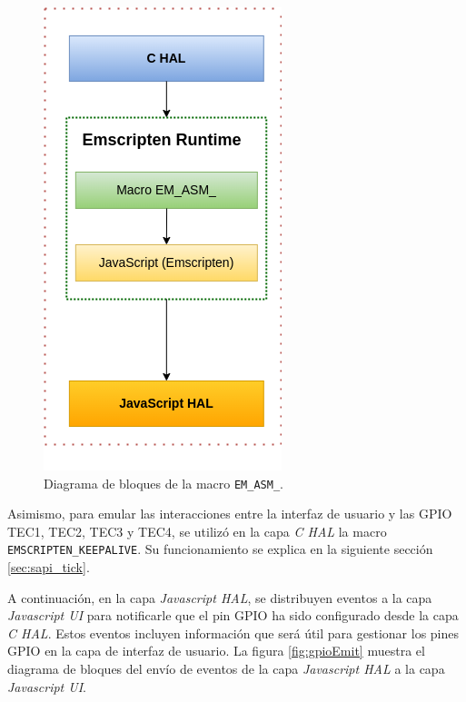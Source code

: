 \hfill \break


\begin{figure}[ht]
	\centering
	\includegraphics[scale=.40]{./Figures/gpioEmscripten.png}
	\caption{Diagrama de bloques de la macro \texttt{EM\_ASM\_}.}
	\label{fig:gpioEmscripten}
\end{figure}


Asimismo, para emular las interacciones entre la interfaz de usuario y las GPIO TEC1, TEC2, TEC3 y TEC4, se utilizó en la capa \textit{C HAL} la macro \newline \texttt{EMSCRIPTEN\_KEEPALIVE}. Su funcionamiento se explica en la siguiente sección \ref{sec:sapi_tick}. 

A continuación, en la capa \textit{Javascript HAL}, se distribuyen eventos a la capa \textit{Javascript UI} para notificarle que el pin GPIO ha sido configurado desde la capa \textit{C HAL}. Estos eventos incluyen información que será útil para gestionar los pines GPIO en la capa de interfaz de usuario. La figura \ref{fig:gpioEmit} muestra el diagrama de bloques del envío de eventos de la capa \textit{Javascript HAL} a la capa \textit{Javascript UI}.

